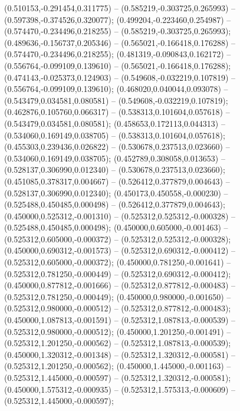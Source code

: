  (0.510153,-0.291454,0.311775) -- (0.585219,-0.303725,0.265993) -- (0.597398,-0.374526,0.320077);
 (0.499204,-0.223460,0.254987) -- (0.574470,-0.234496,0.218255) -- (0.585219,-0.303725,0.265993);
 (0.489636,-0.156737,0.205346) -- (0.565021,-0.166418,0.176288) -- (0.574470,-0.234496,0.218255);
 (0.481319,-0.090843,0.162172) -- (0.556764,-0.099109,0.139610) -- (0.565021,-0.166418,0.176288);
 (0.474143,-0.025373,0.124903) -- (0.549608,-0.032219,0.107819) -- (0.556764,-0.099109,0.139610);
 (0.468020,0.040044,0.093078) -- (0.543479,0.034581,0.080581) -- (0.549608,-0.032219,0.107819);
 (0.462876,0.105760,0.066317) -- (0.538313,0.101604,0.057618) -- (0.543479,0.034581,0.080581);
 (0.458653,0.172113,0.044313) -- (0.534060,0.169149,0.038705) -- (0.538313,0.101604,0.057618);
 (0.455303,0.239436,0.026822) -- (0.530678,0.237513,0.023660) -- (0.534060,0.169149,0.038705);
 (0.452789,0.308058,0.013653) -- (0.528137,0.306990,0.012340) -- (0.530678,0.237513,0.023660);
 (0.451085,0.378317,0.004667) -- (0.526412,0.377879,0.004643) -- (0.528137,0.306990,0.012340);
 (0.450173,0.450558,-0.000230) -- (0.525488,0.450485,0.000498) -- (0.526412,0.377879,0.004643);
 (0.450000,0.525312,-0.001310) -- (0.525312,0.525312,-0.000328) -- (0.525488,0.450485,0.000498);
 (0.450000,0.605000,-0.001463) -- (0.525312,0.605000,-0.000372) -- (0.525312,0.525312,-0.000328);
 (0.450000,0.690312,-0.001573) -- (0.525312,0.690312,-0.000412) -- (0.525312,0.605000,-0.000372);
 (0.450000,0.781250,-0.001641) -- (0.525312,0.781250,-0.000449) -- (0.525312,0.690312,-0.000412);
 (0.450000,0.877812,-0.001666) -- (0.525312,0.877812,-0.000483) -- (0.525312,0.781250,-0.000449);
 (0.450000,0.980000,-0.001650) -- (0.525312,0.980000,-0.000512) -- (0.525312,0.877812,-0.000483);
 (0.450000,1.087813,-0.001591) -- (0.525312,1.087813,-0.000539) -- (0.525312,0.980000,-0.000512);
 (0.450000,1.201250,-0.001491) -- (0.525312,1.201250,-0.000562) -- (0.525312,1.087813,-0.000539);
 (0.450000,1.320312,-0.001348) -- (0.525312,1.320312,-0.000581) -- (0.525312,1.201250,-0.000562);
 (0.450000,1.445000,-0.001163) -- (0.525312,1.445000,-0.000597) -- (0.525312,1.320312,-0.000581);
 (0.450000,1.575312,-0.000935) -- (0.525312,1.575313,-0.000609) -- (0.525312,1.445000,-0.000597);
